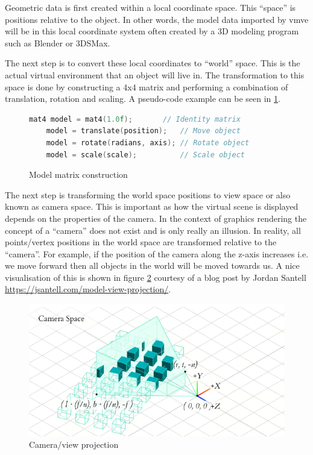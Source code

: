 \documentclass[11pt]{article}
\begin{document}
Geometric data is first created within a local coordinate space. This ``space''
is positions relative to the object. In other words, the model data imported by
\gls*{vmve} will be in this local coordinate system often created by a 3D modeling
program such as Blender or 3DSMax.

The next step is to convert these local coordinates to ``world'' space. This is
the actual virtual environment that an object will live in. The transformation
to this space is done by constructing a 4x4 matrix and performing a combination
of translation, rotation and scaling. A pseudo-code example can be seen in
\ref{fig:local_to_world}.

\begin{figure}[H]
  \centering
  \begin{lstlisting}[language=C++]
    mat4 model = mat4(1.0f);       // Identity matrix
    model = translate(position);   // Move object
    model = rotate(radians, axis); // Rotate object
    model = scale(scale);          // Scale object
  \end{lstlisting}
  \caption{Model matrix construction}
  \label{fig:local_to_world}
\end{figure}
  

The next step is transforming the world space positions to view space or also
known as camera space. This is important as how the virtual scene is displayed
depends on the properties of the camera. In the context of graphics rendering
the concept of a ``camera'' does not exist and is only really an illusion. In
reality, all points/vertex positions in the world space are transformed relative
to the ``camera''. For example, if the position of the camera along the z-axis
increases i.e. we move forward then all objects in the world will be moved
towards us. A nice visualisation of this is shown in figure
\ref{fig:camera_projection} courtesy of a blog post by Jordan Santell
\href{https://jsantell.com/model-view-projection/}{https://jsantell.com/model-view-projection/}.

\begin{figure}[H]
  \centering
  \includegraphics[width=\textwidth]{images/camera_space.png}
  \caption{Camera/view projection \cite{camera_projection}}
  \label{fig:camera_projection} 
\end{figure}
\end{document}

